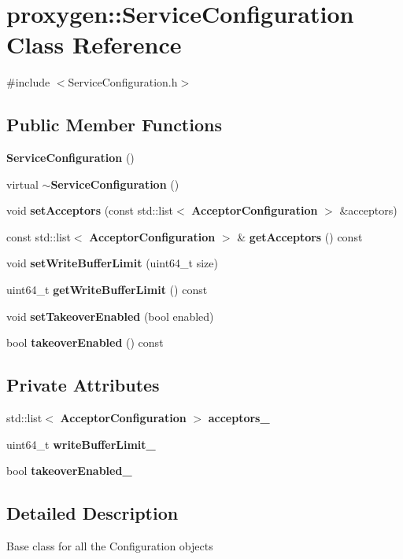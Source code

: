\section{proxygen\+:\+:Service\+Configuration Class Reference}
\label{classproxygen_1_1ServiceConfiguration}


{\ttfamily \#include $<$Service\+Configuration.\+h$>$}

\subsection*{Public Member Functions}
\begin{DoxyCompactItemize}
\item 
{\bf Service\+Configuration} ()
\item 
virtual {\bf $\sim$\+Service\+Configuration} ()
\item 
void {\bf set\+Acceptors} (const std\+::list$<$ {\bf Acceptor\+Configuration} $>$ \&acceptors)
\item 
const std\+::list$<$ {\bf Acceptor\+Configuration} $>$ \& {\bf get\+Acceptors} () const 
\item 
void {\bf set\+Write\+Buffer\+Limit} (uint64\+\_\+t size)
\item 
uint64\+\_\+t {\bf get\+Write\+Buffer\+Limit} () const 
\item 
void {\bf set\+Takeover\+Enabled} (bool enabled)
\item 
bool {\bf takeover\+Enabled} () const 
\end{DoxyCompactItemize}
\subsection*{Private Attributes}
\begin{DoxyCompactItemize}
\item 
std\+::list$<$ {\bf Acceptor\+Configuration} $>$ {\bf acceptors\+\_\+}
\item 
uint64\+\_\+t {\bf write\+Buffer\+Limit\+\_\+}
\item 
bool {\bf takeover\+Enabled\+\_\+}
\end{DoxyCompactItemize}


\subsection{Detailed Description}
Base class for all the Configuration objects 

